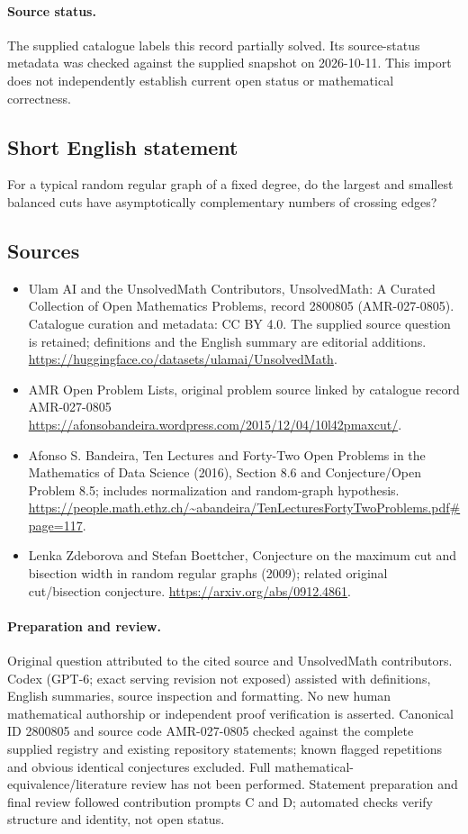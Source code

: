 \documentclass[11pt]{article}
\begin{document}
\paragraph{Source status.}
The supplied catalogue labels this record partially solved. Its source-status metadata was checked against the supplied snapshot on 2026-10-11. This import does not independently establish current open status or mathematical correctness.
\subsection{Short English statement}
For a typical random regular graph of a fixed degree, do the largest and smallest balanced cuts have asymptotically complementary numbers of crossing edges?
\subsection{Sources}
\begin{itemize}
\item[\hypertarget{source:2800805:1}{S1}] Ulam AI and the UnsolvedMath Contributors, UnsolvedMath: A Curated Collection of Open Mathematics Problems, record 2800805 (AMR-027-0805). Catalogue curation and metadata: CC BY 4.0. The supplied source question is retained; definitions and the English summary are editorial additions.
\url{https://huggingface.co/datasets/ulamai/UnsolvedMath}.
\item[\hypertarget{source:2800805:2}{S2}] AMR Open Problem Lists, original problem source linked by catalogue record AMR-027-0805
\url{https://afonsobandeira.wordpress.com/2015/12/04/10l42pmaxcut/}.
\item[\hypertarget{source:2800805:3}{S3}] Afonso S. Bandeira, Ten Lectures and Forty-Two Open Problems in the Mathematics of Data Science (2016), Section 8.6 and Conjecture/Open Problem 8.5; includes normalization and random-graph hypothesis.
\url{https://people.math.ethz.ch/~abandeira/TenLecturesFortyTwoProblems.pdf#page=117}.
\item[\hypertarget{source:2800805:4}{S4}] Lenka Zdeborova and Stefan Boettcher, Conjecture on the maximum cut and bisection width in random regular graphs (2009); related original cut/bisection conjecture.
\url{https://arxiv.org/abs/0912.4861}.
\end{itemize}
\paragraph{Preparation and review.}
Original question attributed to the cited source and UnsolvedMath contributors. Codex (GPT-6; exact serving revision not exposed) assisted with definitions, English summaries, source inspection and formatting. No new human mathematical authorship or independent proof verification is asserted. Canonical ID 2800805 and source code AMR-027-0805 checked against the complete supplied registry and existing repository statements; known flagged repetitions and obvious identical conjectures excluded. Full mathematical-equivalence/literature review has not been performed. Statement preparation and final review followed contribution prompts C and D; automated checks verify structure and identity, not open status.
\label{end:2800805}
\end{document}
